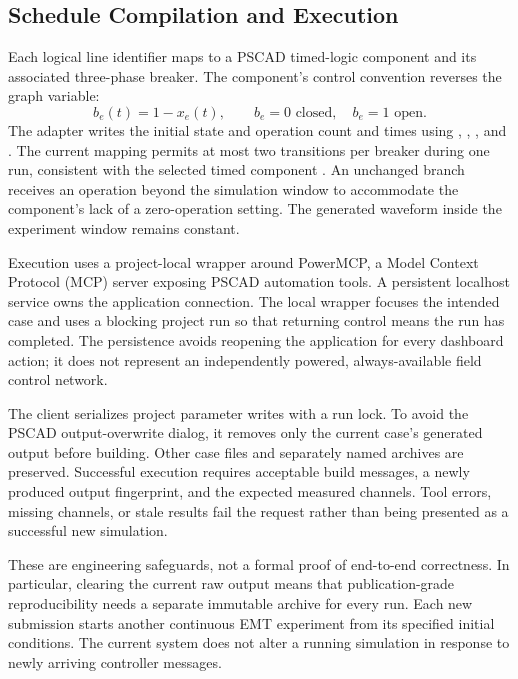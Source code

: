 \subsection{Schedule Compilation and Execution}
Each logical line identifier maps to a PSCAD timed-logic component and its
associated three-phase breaker. The component's control convention reverses
the graph variable:
\begin{equation}
 b_e(t)=1-x_e(t),\qquad b_e=0\text{ closed},\quad b_e=1\text{ open}.
\label{eq:polarity}
\end{equation}
The adapter writes the initial state and operation count and times using
, , , and . The current mapping
permits at most two transitions per breaker during one run, consistent with
the selected timed component \cite{pscadTimedBreaker}. An unchanged branch
receives an operation beyond the simulation window to accommodate the
component's lack of a zero-operation setting. The generated waveform inside
the experiment window remains constant.

Execution uses a project-local wrapper around PowerMCP, a Model Context
Protocol (MCP) server exposing PSCAD automation tools. A persistent localhost
service owns the application connection. The local wrapper focuses the intended
case and uses a blocking project run so that returning control means the run
has completed. The persistence avoids reopening the application for every
dashboard action; it does not represent an independently powered,
always-available field control network.

The client serializes project parameter writes with a run lock. To avoid the
PSCAD output-overwrite dialog, it removes only the current case's generated
output before building. Other case files and separately named archives are
preserved. Successful execution requires acceptable build messages, a newly
produced output fingerprint, and the expected measured channels. Tool errors,
missing channels, or stale results fail the request rather than being presented
as a successful new simulation.

These are engineering safeguards, not a formal proof of end-to-end correctness.
In particular, clearing the current raw output means that publication-grade
reproducibility needs a separate immutable archive for every run. Each new
submission starts another continuous EMT experiment from its specified initial
conditions. The current system does not alter a running simulation in response
to newly arriving controller messages.
